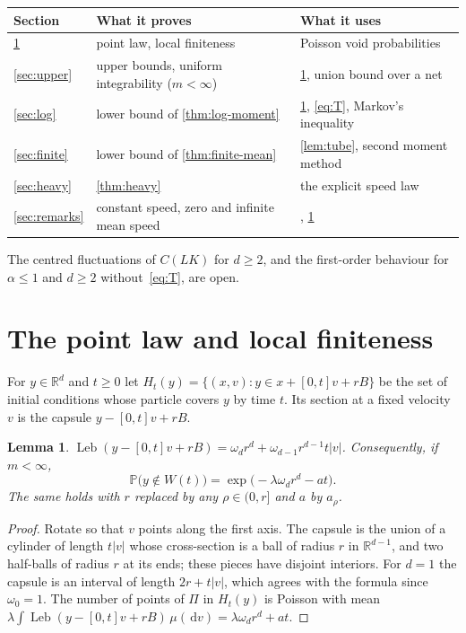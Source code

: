 \documentclass[11pt,a4paper]{article}
\numberwithin{equation}{section}
\newtheorem{lemma}[theorem]{Lemma}
\theoremstyle{definition}
\theoremstyle{remark}
\newcommand{\Pp}{\mathbb P}
\newcommand{\R}{\mathbb R}
\newcommand{\dd}{\,\mathrm d}
\newcommand{\Leb}{\operatorname{Leb}}
\newcommand{\abs}[1]{\lvert#1\rvert}
\begin{document}
\begin{center}
\small
\begin{tabular}{@{}lll@{}}
\toprule
Section & What it proves & What it uses\\
\midrule
\ref{sec:basic} & point law, local finiteness & Poisson void probabilities\\
\ref{sec:upper} & upper bounds, uniform integrability ($m<\infty$) & \cref{lem:point}, union bound over a net\\
\ref{sec:log} & lower bound of \cref{thm:log-moment} & \cref{lem:point}, \eqref{eq:T}, Markov's inequality\\
\ref{sec:finite} & lower bound of \cref{thm:finite-mean} & \cref{lem:tube}, second moment method\\
\ref{sec:heavy} & \cref{thm:heavy} & the explicit speed law\\
\ref{sec:remarks} & constant speed, zero and infinite mean speed & \cite{Jan86,Hal88}, \cref{lem:point}\\
\bottomrule
\end{tabular}
\end{center}

The centred fluctuations of $C(LK)$ for $d\ge2$, and the first-order
behaviour for $\alpha\le1$ and $d\ge2$ without~\eqref{eq:T}, are open.

\section{The point law and local finiteness}\label{sec:basic}

For $y\in\R^d$ and $t\ge0$ let
$H_t(y)=\{(x,v):y\in x+[0,t]v+rB\}$ be the set of initial conditions whose
particle covers $y$ by time $t$. Its section at a fixed velocity $v$ is the
capsule $y-[0,t]v+rB$.

\begin{lemma}\label{lem:point}
$\Leb(y-[0,t]v+rB)=\omega_dr^d+\omega_{d-1}r^{d-1}t\abs{v}$. Consequently, if
$m<\infty$,
\[
\Pp\bigl(y\notin W(t)\bigr)=\exp\bigl(-\lambda\omega_dr^d-at\bigr).
\]
The same holds with $r$ replaced by any $\rho\in(0,r]$ and $a$ by $a_\rho$.
\end{lemma}

\begin{proof}
Rotate so that $v$ points along the first axis. The capsule is the union of a
cylinder of length $t\abs v$ whose cross-section is a ball of radius $r$ in
$\R^{d-1}$, and two half-balls of radius $r$ at its ends; these pieces have
disjoint interiors. For $d=1$ the capsule is an interval of length
$2r+t\abs v$, which agrees with the formula since $\omega_0=1$. The number of
points of $\Pi$ in $H_t(y)$ is Poisson with mean
$\lambda\int\Leb(y-[0,t]v+rB)\,\mu(\dd v)=\lambda\omega_dr^d+at$.
\end{proof}
\end{document}
